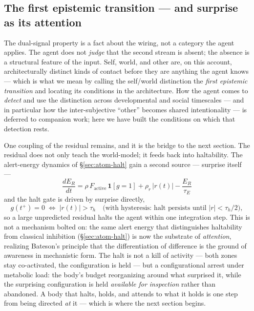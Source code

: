 \documentclass{article}
\begin{document}
\subsection{The first epistemic transition --- and surprise as its
attention}\label{sec:world-attention}

The dual-signal property is a fact about the wiring, not a category the
agent applies.  The agent does not \emph{judge} that the second stream is
absent; the absence is a structural feature of the input.  Self, world,
and other are, on this account, architecturally distinct kinds of contact
before they are anything the agent knows --- which is what we mean by
calling the self/world distinction the \emph{first epistemic transition}
and locating its conditions in the architecture.  How the agent comes to
\emph{detect} and use the distinction across developmental and social
timescales --- and in particular how the inter-subjective ``other'' becomes
shared intentionality --- is deferred to companion work; here we have built
the conditions on which that detection rests.

One coupling of the residual remains, and it is the bridge to the next
section.  The residual does not only teach the world-model; it feeds back
into haltability.  The alert-energy dynamics of \S\ref{sec:atom-halt} gain
a second source --- surprise itself ---
\begin{equation}
\boxed{\;\frac{dE_R}{dt} = \rho\,F_{\text{active}}\,\mathbf{1}[g=1]
              + \rho_r\,|r(t)| - \frac{E_R}{\tau_E}\;}
\label{eq:alertenergy-with-surprise}
\end{equation}
and the halt gate is driven by surprise directly,
\begin{equation}
g(t^+) = 0 \;\Longleftrightarrow\; |r(t)| > \tau_h
\quad\text{(with hysteresis: halt persists until }|r|<\tau_h/2\text{)},
\label{eq:autohalt}
\end{equation}
so a large unpredicted residual halts the agent within one integration
step.  This is not a mechanism bolted on: the same alert energy that
distinguishes haltability from classical inhibition (\S\ref{sec:atom-halt})
is now the substrate of \emph{attention}, realizing Bateson's principle
that the differentiation of difference is the ground of awareness
\citep{bateson2000steps} in mechanistic form.  The halt is not a kill of
activity --- both zones stay co-activated, the configuration is held --- but
a configurational arrest under metabolic load: the body's budget
reorganizing around what surprised it, while the surprising configuration
is held \emph{available for inspection} rather than abandoned.  A body
that halts, holds, and attends to what it holds is one step from being
directed \emph{at} it --- which is where the next section begins.
\end{document}
